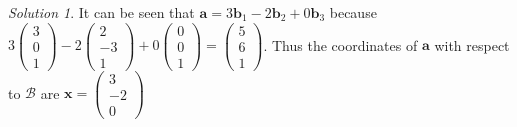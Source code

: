 \documentclass[
]{book}
\theoremstyle{definition}
\theoremstyle{definition}
\theoremstyle{definition}
\theoremstyle{definition}
\theoremstyle{remark}
\newtheorem*{solution}{Solution}
\begin{document}
\begin{solution}

It can be seen that \(\mathbf{a} = 3 \mathbf{b}_1 - 2 \mathbf{b}_2 + 0 \mathbf{b}_3\) because \(3 \begin{pmatrix} 3 \\ 0 \\ 1 \end{pmatrix} - 2 \begin{pmatrix} 2 \\ -3 \\ 1 \end{pmatrix} + 0 \begin{pmatrix} 0 \\ 0 \\ 1 \end{pmatrix} = \begin{pmatrix} 5 \\ 6 \\ 1 \end{pmatrix}\). Thus the coordinates of \(\mathbf{a}\) with respect to \(\mathcal{B}\) are \(\mathbf{x} = \begin{pmatrix} 3 \\ -2 \\ 0 \end{pmatrix}\)


\end{solution}
\end{document}
